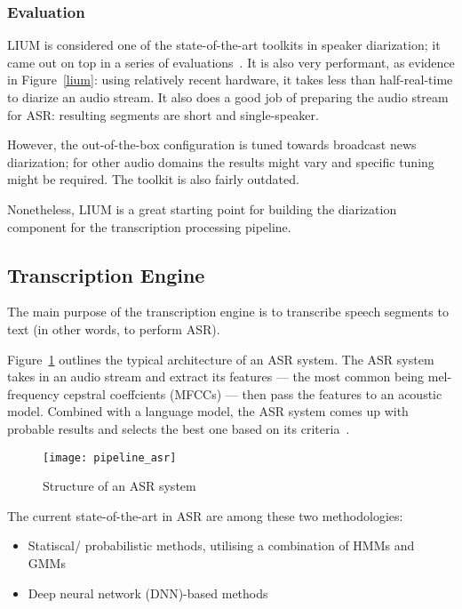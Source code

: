 \subsubsection{Evaluation}

LIUM is considered one of the state-of-the-art toolkits in speaker
diarization; it came out on top in a series of evaluations~\cite{lium-ester,
lium-revere}. It is also very performant, as evidence in Figure~\ref{lium}:
using relatively recent hardware, it takes less than half-real-time
to diarize an audio stream. It also does a good job of preparing the
audio stream for ASR\@: resulting segments are short and single-speaker.

However, the out-of-the-box configuration is tuned towards broadcast
news diarization; for other audio domains the results might vary
and specific tuning might be required. The toolkit is also fairly outdated.

Nonetheless, LIUM is a great starting point for building the diarization
component for the transcription processing pipeline. 

\subsection{Transcription Engine}

The main purpose of the transcription engine is to transcribe speech
segments to text (in other words, to perform ASR). 

Figure~\ref{asr} outlines the typical architecture of an ASR
system. The ASR system takes in an audio stream and extract
its features --- the most common being mel-frequency cepstral
coeffcients (MFCCs) --- then pass the features to an acoustic model.
Combined with a language model, the ASR system comes up with probable
results and selects the best one based on its criteria~\cite{asr}.

\begin{figure}[h]
\begin{center}
    \texttt{[image: pipeline\_asr]}
    \caption{Structure of an ASR system}\label{asr}
\end{center}
\end{figure}

The current state-of-the-art in ASR are among these two methodologies:

\begin{itemize}
    \item Statiscal/ probabilistic methods, utilising a combination of
    HMMs and GMMs
    \item Deep neural network (DNN)-based methods
\end{itemize}

